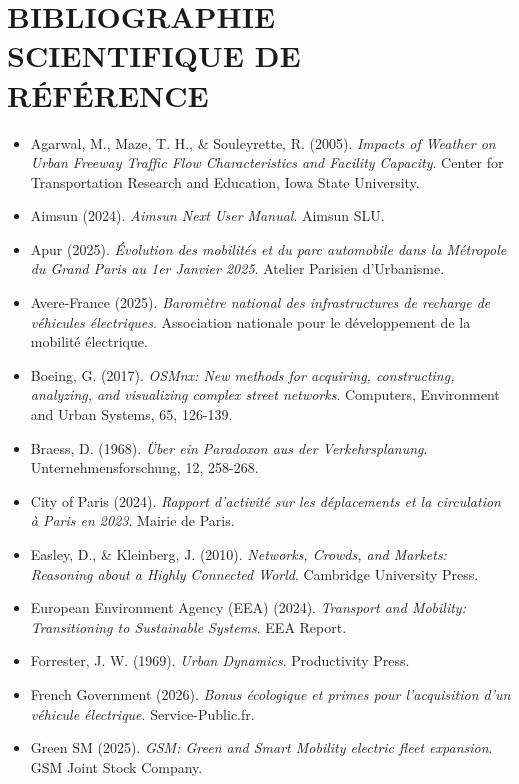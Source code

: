 \documentclass[10pt, a4paper]{article}
\providecommand{\tightlist}{}
\begin{document}
\newpage

\section{BIBLIOGRAPHIE SCIENTIFIQUE DE
RÉFÉRENCE}\label{bibliographie-scientifique-de-ruxe9fuxe9rence}

\begin{itemize}
\tightlist
\item
  Agarwal, M., Maze, T. H., \& Souleyrette, R. (2005). \emph{Impacts of
  Weather on Urban Freeway Traffic Flow Characteristics and Facility
  Capacity}. Center for Transportation Research and Education, Iowa
  State University.
\item
  Aimsun (2024). \emph{Aimsun Next User Manual}. Aimsun SLU.
\item
  Apur (2025). \emph{Évolution des mobilités et du parc automobile dans
  la Métropole du Grand Paris au 1er Janvier 2025}. Atelier Parisien
  d'Urbanisme.
\item
  Avere-France (2025). \emph{Baromètre national des infrastructures de
  recharge de véhicules électriques}. Association nationale pour le
  développement de la mobilité électrique.
\item
  Boeing, G. (2017). \emph{OSMnx: New methods for acquiring,
  constructing, analyzing, and visualizing complex street networks}.
  Computers, Environment and Urban Systems, 65, 126-139.
\item
  Braess, D. (1968). \emph{Über ein Paradoxon aus der Verkehrsplanung}.
  Unternehmensforschung, 12, 258-268.
\item
  City of Paris (2024). \emph{Rapport d'activité sur les déplacements et
  la circulation à Paris en 2023}. Mairie de Paris.
\item
  Easley, D., \& Kleinberg, J. (2010). \emph{Networks, Crowds, and
  Markets: Reasoning about a Highly Connected World}. Cambridge
  University Press.
\item
  European Environment Agency (EEA) (2024). \emph{Transport and
  Mobility: Transitioning to Sustainable Systems}. EEA Report.
\item
  Forrester, J. W. (1969). \emph{Urban Dynamics}. Productivity Press.
\item
  French Government (2026). \emph{Bonus écologique et primes pour
  l'acquisition d'un véhicule électrique}. Service-Public.fr.
\item
  Green SM (2025). \emph{GSM: Green and Smart Mobility electric fleet
  expansion}. GSM Joint Stock Company.

\end{itemize}
\end{document}
